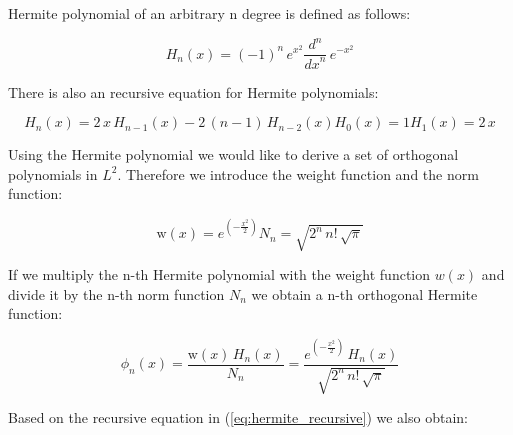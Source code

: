 \documentclass[12pt,twoside,a4paper]{article}
\numberwithin{equation}{subsection}
\numberwithin{figure}{subsection}
\begin{document}
Hermite polynomial of an arbitrary n degree is defined as follows:

\begin{equation} \label{eq:hermite_definition}
	H_n(x) = ( - 1)^{n} \, e ^ {x ^ 2} \frac { d ^ n } {{dx}^{n}} \, e^{ - x ^ 2}
\end{equation}

There is also an recursive equation for Hermite polynomials:

\begin{subequations} \label{eq:hermite_recursive}
  \begin{equation}   \label{eq:hrec_next}
    H_n (x) = 2 \, x \, H_{n - 1}(x) - 2 \, (n - 1) \, H_{n - 2}(x)
  \end{equation}
  \begin{equation}   \label{eq:hrec_first}
    H_0 (x) = 1
  \end{equation}
  \begin{equation}   \label{eq:hrec_second}
    H_1 (x) = 2 \, x
  \end{equation}
\end{subequations}

Using the Hermite polynomial we would like to derive a set of orthogonal polynomials in $L ^ 2$. Therefore we introduce the weight function and the norm function:

\begin{subequations} \label{eq:hermite_weight}
  \begin{equation}   \label{eq:hwht_weight}
    \mathrm{w}(x) = e^{( - \frac {x^{2}}{2})}
  \end{equation}
  \begin{equation}   \label{eq:hwht_iter}
    N_n = \sqrt{2^{n} \, n\mathrm{!} \, \sqrt{\pi }}
  \end{equation}
\end{subequations}

If we multiply the n-th Hermite polynomial with the weight function $w(x)$ and divide it by the n-th norm function $N_n$ we obtain a n-th orthogonal Hermite function:

\begin{equation} \label{eq:hermite_orthogonal}
  \phi_n (x) = \frac {\mathrm{w}(x) \, H_n (x)} {N_n} 
  	= \frac {e^{( - \frac {x ^ 2}{2})} \, H_n (x)} {\sqrt{2^{n} \, n\mathrm{!} \, \sqrt {\pi }}}
\end{equation}

Based on the recursive equation in (\ref{eq:hermite_recursive}) we also obtain:
\end{document}
